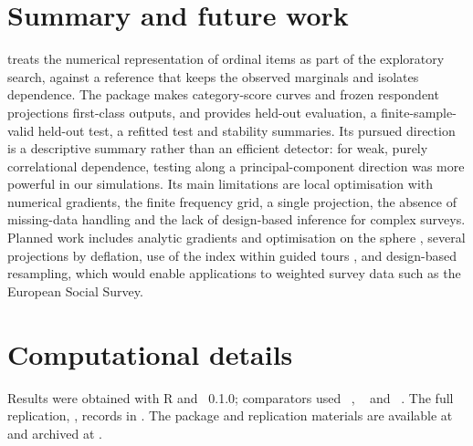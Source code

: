 \section{Summary and future work}
 treats the numerical representation of ordinal items as part of the exploratory search, against a reference that keeps the observed marginals and isolates dependence. The package makes category-score curves and frozen respondent projections first-class outputs, and provides held-out evaluation, a finite-sample-valid held-out test, a refitted test and stability summaries. Its pursued direction is a descriptive summary rather than an efficient detector: for weak, purely correlational dependence, testing along a principal-component direction was more powerful in our simulations. Its main limitations are local optimisation with numerical gradients, the finite frequency grid, a single projection, the absence of missing-data handling and the lack of design-based inference for complex surveys. Planned work includes analytic gradients and optimisation on the sphere \citep{absil2008}, several projections by deflation, use of the index within guided tours \citep{wickham2011}, and design-based resampling, which would enable applications to weighted survey data such as the European Social Survey.

\section{Computational details}
Results were obtained with R \Rversion{} and ~0.1.0; comparators used ~\verPsych{}, ~\verGifi{} and ~\verOrdPens{}. The full replication, , records  in . The package and replication materials are available at \repoLink{} and archived at \zenodoLink{}.



\address{Diego Andres Perez Ruiz\\
  Department of Social Statistics\\
  School of Social Sciences, University of Manchester\\
  Manchester, United Kingdom\\}
\email{\authorEmail}
